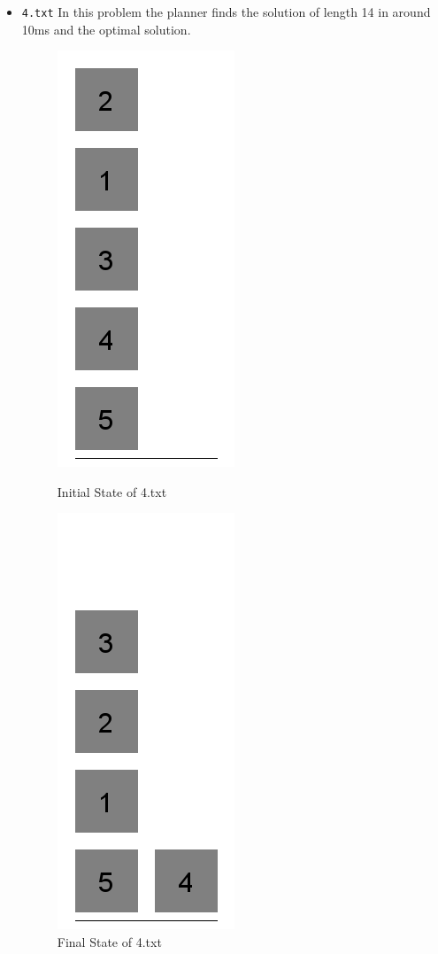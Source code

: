 \documentclass{article}
\begin{document}
\begin{itemize}
\item \verb|4.txt| In this problem the planner finds the solution of length 14 in around 10ms and the optimal solution.

\begin{figure}[H]
    \centering
    \begin{minipage}{0.45\textwidth}
        \centering
        \includegraphics[scale=0.3]{4i}
        \caption{Initial State of 4.txt}
    \end{minipage}\hfill
    \begin{minipage}{0.45\textwidth}
        \centering
        \includegraphics[scale=0.3]{4f}
        \caption{Final State  of 4.txt}
    \end{minipage}
\end{figure}
\end{itemize}
\end{document}
